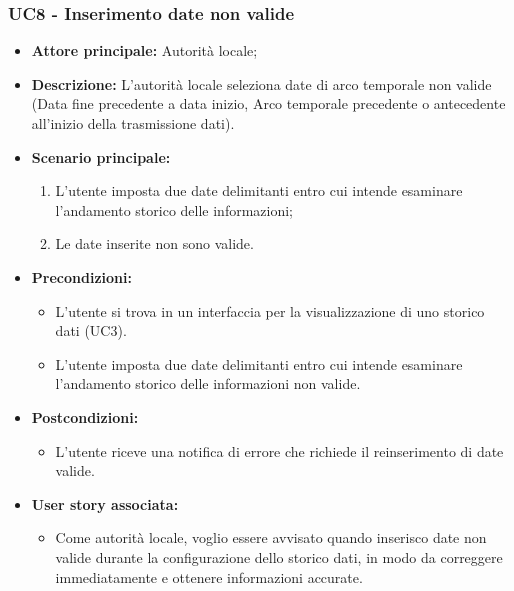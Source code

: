 \subsubsection{UC8 - Inserimento date non valide}
\begin{itemize}
    \item \textbf{Attore principale:} Autorità locale;
    \item \textbf{Descrizione:} L’autorità locale seleziona date di arco temporale non valide (Data fine precedente a data inizio, Arco temporale precedente o antecedente all'inizio della trasmissione dati).
    \item \textbf{Scenario principale:}
          \begin{enumerate}
              \item L'utente imposta due date delimitanti entro cui intende esaminare l'andamento storico delle informazioni;
              \item Le date inserite non sono valide.
          \end{enumerate}
    \item \textbf{Precondizioni:}
          \begin{itemize}
              \item  L'utente si trova in un interfaccia per la visualizzazione di uno storico dati  (UC3).
              \item L'utente imposta due date delimitanti entro cui intende esaminare l'andamento storico delle informazioni
                    non valide.
          \end{itemize}
    \item \textbf{Postcondizioni:}
          \begin{itemize}
              \item  L'utente riceve una notifica di errore che richiede il reinserimento di date valide.
          \end{itemize}
    \item \textbf{User story associata:}
          \begin{itemize}
              \item Come autorità locale, voglio essere avvisato quando inserisco date non valide durante la configurazione dello storico dati, in modo da correggere immediatamente e ottenere informazioni accurate.
          \end{itemize}
\end{itemize}